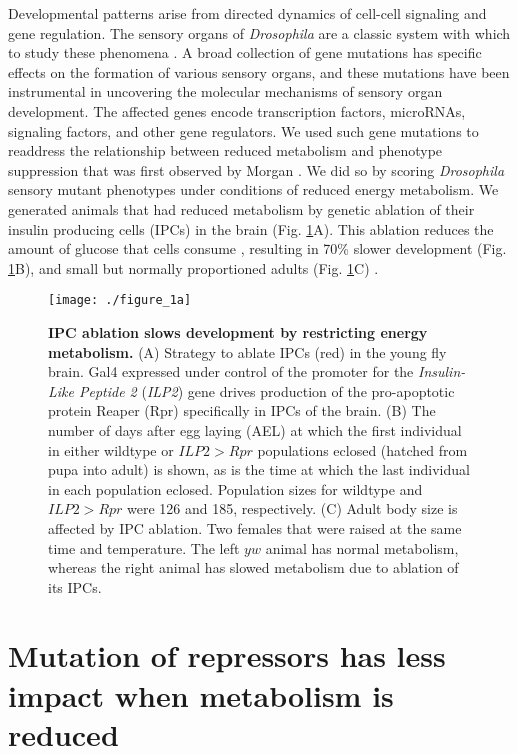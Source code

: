 Developmental patterns arise from directed dynamics of cell-cell signaling and gene regulation. The sensory organs of \textit{Drosophila} are a classic system with which to study these phenomena \cite{Quan2005}. A broad collection of gene mutations has specific effects on the formation of various sensory organs, and these mutations have been instrumental in uncovering the molecular mechanisms of sensory organ development. The affected genes encode transcription factors, microRNAs, signaling factors, and other gene regulators. We used such gene mutations to readdress the relationship between reduced metabolism and phenotype suppression that was first observed by Morgan \cite{Morgan1915,Morgan1929}. We did so by scoring \textit{Drosophila} sensory mutant phenotypes under conditions of reduced energy metabolism. We generated animals that had reduced metabolism by genetic ablation of their insulin producing cells (IPCs) in the brain (Fig. \ref{fig:metabolism:fig1a}A). This ablation reduces the amount of glucose that cells consume \cite{Rulifson2002}, resulting in 70\% slower development (Fig. \ref{fig:metabolism:fig1a}B), and small but normally proportioned adults (Fig. \ref{fig:metabolism:fig1a}C) \cite{Rulifson2002}.

\begin{figure}[h!]
\centering
\texttt{[image: ./figure\_1a]}
\caption[IPC ablation slows development by restricting energy metabolism.]{\textbf{IPC ablation slows development by restricting energy metabolism.} (A) Strategy to ablate IPCs (red) in the young fly brain. Gal4 expressed under control of the promoter for the \textit{Insulin-Like Peptide 2} (\textit{ILP2}) gene drives production of the pro-apoptotic protein Reaper (Rpr) specifically in IPCs of the brain. (B) The number of days after egg laying (AEL) at which the first individual in either wildtype or $ILP2>Rpr$ populations eclosed (hatched from pupa into adult) is shown, as is the time at which the last individual in each population eclosed. Population sizes for wildtype and $ILP2>Rpr$ were 126 and 185, respectively. (C) Adult body size is affected by IPC ablation. Two females that were raised at the same time and temperature. The left $y w$ animal has normal metabolism, whereas the right animal has slowed metabolism due to ablation of its IPCs.}
\label{fig:metabolism:fig1a}
\end{figure}

\section{Mutation of repressors has less impact when metabolism is reduced}

